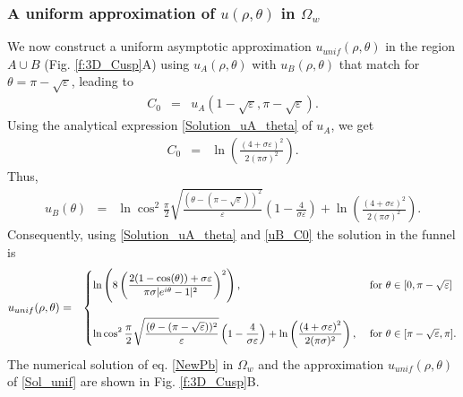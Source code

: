 \documentclass[12pt]{article}
\newcommand{\ds}{\displaystyle}
\newcommand{\beq}{\begin{eqnarray}}
\newcommand{\eeq}{\end{eqnarray}}
\newcommand{\eps}{\varepsilon}
\begin{document}
\subsubsection*{A uniform approximation of $u(\rho,\theta)$ in $\Omega_w$}\label{s:unif}
We now construct a uniform asymptotic approximation $u_{unif}(\rho,\theta)$ in the region $A\cup B$ (Fig. \ref{f:3D_Cusp}A) using  $u_A(\rho,\theta)$ with $u_B(\rho,\theta)$ that match for $\theta=\pi-\sqrt{\eps}$, leading to
\beq
C_0&=&u_A\left(1-\sqrt{\eps},\pi-\sqrt{\eps}\right).
\eeq
Using the analytical expression \eqref{Solution_uA_theta} of $u_A$, we get
\beq\label{C_0}
C_0&=& \ln\left(  \frac{\left(4  +\sigma\eps\right)^2}{2(\pi\sigma )^2}\right).
\eeq
Thus,
\beq\label{uB_C0}
u_{B}(\theta)&=& \ln\cos^2 \frac{\pi}{2}\sqrt{\frac{(\theta-(\pi-\sqrt{\eps}))^2}{\eps}}
\left(1-\frac{4 }{\sigma\eps} \right) + \ln\left(  \frac{\left(4   +\sigma\eps\right)^2}{2(\pi\sigma )^2}\right).
\eeq
Consequently, using \eqref{Solution_uA_theta} and \eqref{uB_C0} the solution in the funnel is
\beq\label{Sol_unif}
u_{unif}(\rho,\theta)&=&
{\small
\begin{cases}
	   \ds \ln\left( 8\left(\frac{2 (1-\cos(\theta)) +\sigma\eps}{\pi\sigma|e^{i\theta}-1|^2}\right)^2\right), &\hbox{ for }  \theta \in [0, \pi-\sqrt{\eps}] \\
  \\
	 \ds\ln\cos^2 \frac{\pi}{2}\sqrt{\frac{(\theta-(\pi-\sqrt{\eps}))^2}{\eps}}
	\left(1-\frac{4 }{\sigma\eps} \right) + \ln\left(  \frac{\left(4   +\sigma\eps\right)^2}{2(\pi\sigma )^2}\right),& \hbox{ for }  \theta \in [\pi-\sqrt{\eps},\pi].
\end{cases}}
\eeq
The numerical solution of eq. \eqref{NewPb} in $\Omega_w$ and the approximation $u_{unif}(\rho,\theta)$ of \eqref{Sol_unif} are shown in Fig. \ref{f:3D_Cusp}B.
\end{document}
